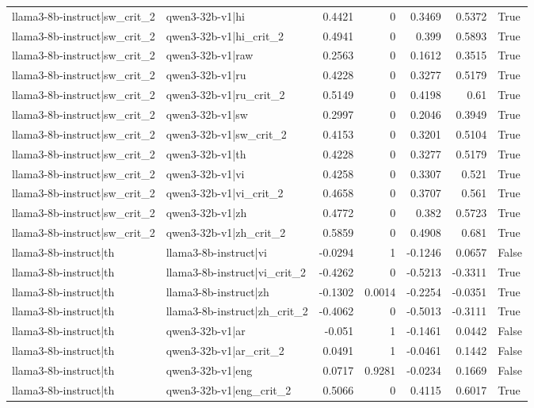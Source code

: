 \begin{table}
\begin{tabular}{l l r r r r l}
llama3-8b-instruct|sw_crit_2 & qwen3-32b-v1|hi & 0.4421 & 0 & 0.3469 & 0.5372 & True \\
llama3-8b-instruct|sw_crit_2 & qwen3-32b-v1|hi_crit_2 & 0.4941 & 0 & 0.399 & 0.5893 & True \\
llama3-8b-instruct|sw_crit_2 & qwen3-32b-v1|raw & 0.2563 & 0 & 0.1612 & 0.3515 & True \\
llama3-8b-instruct|sw_crit_2 & qwen3-32b-v1|ru & 0.4228 & 0 & 0.3277 & 0.5179 & True \\
llama3-8b-instruct|sw_crit_2 & qwen3-32b-v1|ru_crit_2 & 0.5149 & 0 & 0.4198 & 0.61 & True \\
llama3-8b-instruct|sw_crit_2 & qwen3-32b-v1|sw & 0.2997 & 0 & 0.2046 & 0.3949 & True \\
llama3-8b-instruct|sw_crit_2 & qwen3-32b-v1|sw_crit_2 & 0.4153 & 0 & 0.3201 & 0.5104 & True \\
llama3-8b-instruct|sw_crit_2 & qwen3-32b-v1|th & 0.4228 & 0 & 0.3277 & 0.5179 & True \\
llama3-8b-instruct|sw_crit_2 & qwen3-32b-v1|vi & 0.4258 & 0 & 0.3307 & 0.521 & True \\
llama3-8b-instruct|sw_crit_2 & qwen3-32b-v1|vi_crit_2 & 0.4658 & 0 & 0.3707 & 0.561 & True \\
llama3-8b-instruct|sw_crit_2 & qwen3-32b-v1|zh & 0.4772 & 0 & 0.382 & 0.5723 & True \\
llama3-8b-instruct|sw_crit_2 & qwen3-32b-v1|zh_crit_2 & 0.5859 & 0 & 0.4908 & 0.681 & True \\
llama3-8b-instruct|th & llama3-8b-instruct|vi & -0.0294 & 1 & -0.1246 & 0.0657 & False \\
llama3-8b-instruct|th & llama3-8b-instruct|vi_crit_2 & -0.4262 & 0 & -0.5213 & -0.3311 & True \\
llama3-8b-instruct|th & llama3-8b-instruct|zh & -0.1302 & 0.0014 & -0.2254 & -0.0351 & True \\
llama3-8b-instruct|th & llama3-8b-instruct|zh_crit_2 & -0.4062 & 0 & -0.5013 & -0.3111 & True \\
llama3-8b-instruct|th & qwen3-32b-v1|ar & -0.051 & 1 & -0.1461 & 0.0442 & False \\
llama3-8b-instruct|th & qwen3-32b-v1|ar_crit_2 & 0.0491 & 1 & -0.0461 & 0.1442 & False \\
llama3-8b-instruct|th & qwen3-32b-v1|eng & 0.0717 & 0.9281 & -0.0234 & 0.1669 & False \\
llama3-8b-instruct|th & qwen3-32b-v1|eng_crit_2 & 0.5066 & 0 & 0.4115 & 0.6017 & True \\

\end{tabular}
\end{table}

